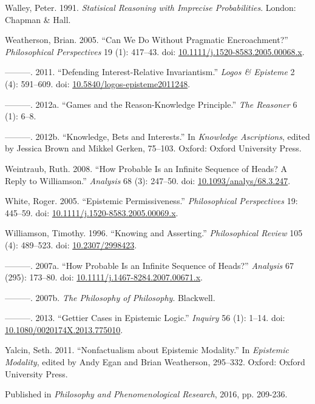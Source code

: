 \documentclass[
  10pt,
  letterpaper,
  DIV=11,
  numbers=noendperiod,
  twoside]{scrartcl}
\newlength{\cslhangindent}
\newenvironment{CSLReferences}[2] %
 {\begin{list}{}{%
  \setlength{\itemindent}{0pt}
  \setlength{\leftmargin}{0pt}
  \setlength{\parsep}{0pt}
  \ifodd #1
   \setlength{\leftmargin}{\cslhangindent}
   \setlength{\itemindent}{-1\cslhangindent}
  \fi
  \setlength{\itemsep}{#2\baselineskip}}}
 {\end{list}}
\begin{document}
\begin{CSLReferences}{1}{0}
Walley, Peter. 1991. \emph{Statisical Reasoning with Imprecise
Probabilities}. London: Chapman \& Hall.

Weatherson, Brian. 2005. {``{Can We Do Without Pragmatic
Encroachment?}''} \emph{Philosophical Perspectives} 19 (1): 417--43.
doi:
\href{https://doi.org/10.1111/j.1520-8583.2005.00068.x}{10.1111/j.1520-8583.2005.00068.x}.

---------. 2011. {``Defending Interest-Relative Invariantism.''}
\emph{Logos \& Episteme} 2 (4): 591--609. doi:
\href{https://doi.org/10.5840/logos-episteme2011248}{10.5840/logos-episteme2011248}.

---------. 2012a. {``Games and the Reason-Knowledge Principle.''}
\emph{The Reasoner} 6 (1): 6--8.

---------. 2012b. {``Knowledge, Bets and Interests.''} In
\emph{Knowledge Ascriptions}, edited by Jessica Brown and Mikkel Gerken,
75--103. Oxford: Oxford University Press.

Weintraub, Ruth. 2008. {``How Probable Is an Infinite Sequence of Heads?
A Reply to Williamson.''} \emph{Analysis} 68 (3): 247--50. doi:
\href{https://doi.org/10.1093/analys/68.3.247}{10.1093/analys/68.3.247}.

White, Roger. 2005. {``Epistemic Permissiveness.''} \emph{Philosophical
Perspectives} 19: 445--59. doi:
\href{https://doi.org/10.1111/j.1520-8583.2005.00069.x}{10.1111/j.1520-8583.2005.00069.x}.

Williamson, Timothy. 1996. {``{Knowing and Asserting}.''}
\emph{Philosophical Review} 105 (4): 489--523. doi:
\href{https://doi.org/10.2307/2998423}{10.2307/2998423}.

---------. 2007a. {``How Probable Is an Infinite Sequence of Heads?''}
\emph{Analysis} 67 (295): 173--80. doi:
\href{https://doi.org/10.1111/j.1467-8284.2007.00671.x}{10.1111/j.1467-8284.2007.00671.x}.

---------. 2007b. \emph{{The Philosophy of Philosophy}}. Blackwell.

---------. 2013. {``Gettier Cases in Epistemic Logic.''} \emph{Inquiry}
56 (1): 1--14. doi:
\href{https://doi.org/10.1080/0020174X.2013.775010}{10.1080/0020174X.2013.775010}.

Yalcin, Seth. 2011. {``Nonfactualism about Epistemic Modality.''} In
\emph{Epistemic Modality}, edited by Andy Egan and Brian Weatherson,
295--332. Oxford: Oxford University Press.

\end{CSLReferences}



\noindent Published in\emph{
Philosophy and Phenomenological Research}, 2016, pp. 209-236.
\end{document}
